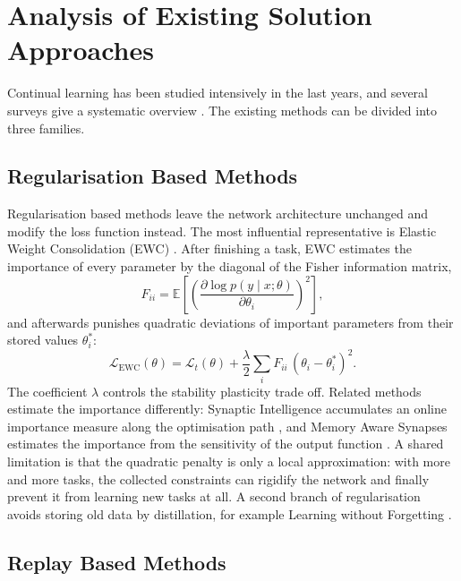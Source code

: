 \section{Analysis of Existing Solution Approaches}
\label{sec:existing}

Continual learning has been studied intensively in the last years, and
several surveys give a systematic overview
\cite{delange2021,wang2024survey,masana2022}. The existing methods can be
divided into three families.

\subsection{Regularisation Based Methods}

Regularisation based methods leave the network architecture unchanged and
modify the loss function instead. The most influential representative is
Elastic Weight Consolidation (EWC) \cite{kirkpatrick2017}. After finishing
a task, EWC estimates the importance of every parameter by the diagonal of
the Fisher information matrix,
\begin{equation}
  F_{ii} = \mathbb{E}\!\left[\left(
    \frac{\partial \log p(y \mid x; \theta)}{\partial \theta_i}
  \right)^{2}\right],
  \label{eq:fisher}
\end{equation}
and afterwards punishes quadratic deviations of important parameters from
their stored values $\theta_i^{*}$:
\begin{equation}
  \mathcal{L}_{\mathrm{EWC}}(\theta)
    = \mathcal{L}_{t}(\theta)
      + \frac{\lambda}{2} \sum_{i} F_{ii}\,(\theta_i - \theta_i^{*})^{2}.
  \label{eq:ewc}
\end{equation}
The coefficient $\lambda$ controls the stability plasticity trade off.
Related methods estimate the importance differently: Synaptic Intelligence
accumulates an online importance measure along the optimisation path
\cite{zenke2017}, and Memory Aware Synapses estimates the importance from
the sensitivity of the output function \cite{aljundi2018}. A shared
limitation is that the quadratic penalty is only a local approximation:
with more and more tasks, the collected constraints can rigidify the
network and finally prevent it from learning new tasks at all. A second
branch of regularisation avoids storing old data by distillation, for
example Learning without Forgetting \cite{li2017}.

\subsection{Replay Based Methods}

